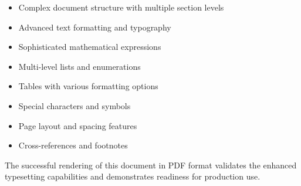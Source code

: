 \documentclass[11pt,letterpaper]{article}
\begin{document}
\begin{itemize}
    \item Complex document structure with multiple section levels
    \item Advanced text formatting and typography
    \item Sophisticated mathematical expressions
    \item Multi-level lists and enumerations
    \item Tables with various formatting options
    \item Special characters and symbols
    \item Page layout and spacing features
    \item Cross-references and footnotes
\end{itemize}

The successful rendering of this document in PDF format validates the enhanced typesetting capabilities and demonstrates readiness for production use.
\end{document}
